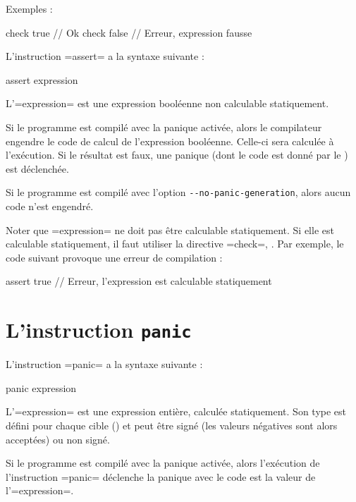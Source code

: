 Exemples :
\begin{PLM}
check true  // Ok
check false // Erreur, expression fausse
\end{PLM}




L'instruction \plm=assert= a la syntaxe suivante :
\begin{PLM}
assert expression
\end{PLM}

L'\plm=expression= est une expression booléenne non calculable statiquement.

Si le programme est compilé avec la panique activée, alors le compilateur engendre le code de calcul de l'expression booléenne. Celle-ci sera calculée à l'exécution. Si le résultat est faux, une panique (dont le code est donné par le ) est déclenchée.

Si le programme est compilé avec l'option \texttt{-{}-no-panic-generation}, alors aucun code n'est engendré.

Noter que \plm=expression= ne doit pas être calculable statiquement. Si elle est calculable statiquement, il faut utiliser la directive \plm=check=, . Par exemple, le code suivant provoque une erreur de compilation :
\begin{PLM}
assert true // Erreur, l'expression est calculable statiquement
\end{PLM}



\section{L'instruction \texttt{panic}}

L'instruction \plm=panic= a la syntaxe suivante :
\begin{PLM}
panic expression
\end{PLM}

L'\plm=expression= est une expression entière, calculée statiquement. Son type est défini pour chaque cible () et peut être signé (les valeurs négatives sont alors acceptées) ou non signé.

Si le programme est compilé avec la panique activée, alors l'exécution de l'instruction \plm=panic= déclenche la panique avec le code est la valeur de l'\plm=expression=.

